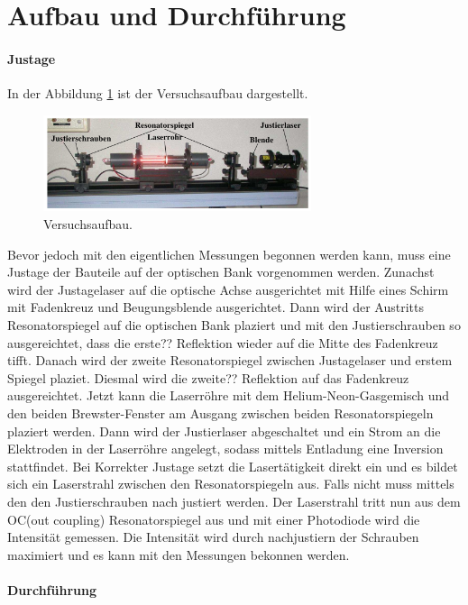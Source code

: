 \newpage
\section{Aufbau und Durchführung}
\label{sec:Durchführung}
\paragraph{Justage}
In der Abbildung \ref{fig:aufbau} ist
der Versuchsaufbau dargestellt.
\begin{figure}
  \centering
  \includegraphics[width=0.7\textwidth]{figures/Aufbau.PNG}
  \caption{Versuchsaufbau.}
  \label{fig:aufbau}
\end{figure}
Bevor jedoch mit den eigentlichen Messungen
begonnen werden
kann, muss eine Justage der Bauteile auf der optischen Bank vorgenommen werden.
Zunachst wird der Justagelaser auf die optische Achse
ausgerichtet
mit Hilfe eines Schirm mit Fadenkreuz und Beugungsblende
ausgerichtet.
Dann wird der Austritts Resonatorspiegel
auf die optischen Bank plaziert
und mit den Justierschrauben so ausgereichtet,
dass die erste?? Reflektion wieder auf die
Mitte des Fadenkreuz tifft.
Danach wird der
zweite Resonatorspiegel zwischen Justagelaser
und erstem Spiegel plaziet.
Diesmal wird die zweite?? Reflektion
auf das Fadenkreuz ausgereichtet.
Jetzt kann die Laserröhre mit dem Helium-Neon-Gasgemisch und
den beiden Brewster-Fenster am Ausgang
zwischen beiden Resonatorspiegeln
plaziert werden.
Dann wird der Justierlaser abgeschaltet
und ein Strom an die
Elektroden in der Laserröhre
angelegt, sodass mittels Entladung eine Inversion
stattfindet. Bei Korrekter
Justage setzt die Lasertätigkeit direkt ein
und es bildet sich ein Laserstrahl
zwischen den Resonatorspiegeln aus.
Falls nicht muss mittels den den Justierschrauben
nach justiert werden.
Der Laserstrahl tritt nun aus dem OC(out coupling) Resonatorspiegel
aus und mit einer Photodiode wird die Intensität gemessen.
Die Intensität wird durch nachjustiern der Schrauben maximiert und
es kann mit den Messungen bekonnen werden.



\paragraph{Durchführung}
